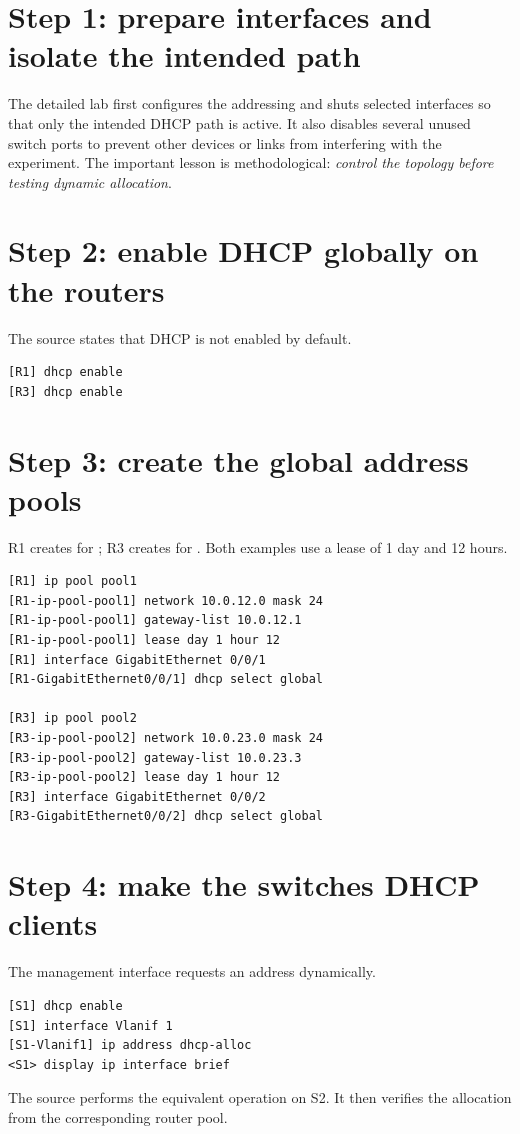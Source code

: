 \section{Step 1: prepare interfaces and isolate the intended path}
The detailed lab first configures the addressing and shuts selected interfaces so that only the intended DHCP path is active. It also disables several unused switch ports to prevent other devices or links from interfering with the experiment. The important lesson is methodological: \emph{control the topology before testing dynamic allocation}.

\section{Step 2: enable DHCP globally on the routers}
The source states that DHCP is not enabled by default.
\begin{lstlisting}[style=dcnterminal]
[R1] dhcp enable
[R3] dhcp enable
\end{lstlisting}

\section{Step 3: create the global address pools}
R1 creates  for ; R3 creates  for . Both examples use a lease of 1 day and 12 hours.

\begin{lstlisting}[style=dcnterminal]
[R1] ip pool pool1
[R1-ip-pool-pool1] network 10.0.12.0 mask 24
[R1-ip-pool-pool1] gateway-list 10.0.12.1
[R1-ip-pool-pool1] lease day 1 hour 12
[R1] interface GigabitEthernet 0/0/1
[R1-GigabitEthernet0/0/1] dhcp select global

[R3] ip pool pool2
[R3-ip-pool-pool2] network 10.0.23.0 mask 24
[R3-ip-pool-pool2] gateway-list 10.0.23.3
[R3-ip-pool-pool2] lease day 1 hour 12
[R3] interface GigabitEthernet 0/0/2
[R3-GigabitEthernet0/0/2] dhcp select global
\end{lstlisting}

\section{Step 4: make the switches DHCP clients}
The management interface requests an address dynamically.
\begin{lstlisting}[style=dcnterminal]
[S1] dhcp enable
[S1] interface Vlanif 1
[S1-Vlanif1] ip address dhcp-alloc
<S1> display ip interface brief
\end{lstlisting}
The source performs the equivalent operation on S2. It then verifies the allocation from the corresponding router pool.

